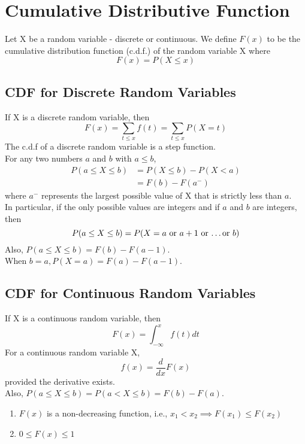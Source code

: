 \section{Cumulative Distributive Function}

\begin{definition}
Let X be a random variable - discrete or continuous. We define $F(x)$ to be the cumulative distribution function (c.d.f.) of the random variable X where
$$
F(x) = P(X \leq x)
$$
\end{definition}

\subsection{CDF for Discrete Random Variables}
If X is a discrete random variable, then
$$
F(x) = \sum_{t \leq x} f(t) = \sum_{t \leq x} P(X = t)
$$
The c.d.f of a discrete random variable is a step function. \\
For any two numbers $a$ and $b$ with $a \leq b$, 
\begin{equation*}
\begin{split}
    P(a \leq X \leq b) &= P(X \leq b) - P(X < a) \\
    &= F(b) - F(a^{-})
\end{split}
\end{equation*}
where $a^{-}$ represents the largest possible value of X that is strictly less than $a$. \\
In particular, if the only possible values are integers and if $a$ and $b$ are integers, then 
$$
P(a \leq X \leq b) = P(X = a \text{ or } a + 1 \text{ or \dots or } b)
$$
Also, $P(a \leq X \leq b) = F(b) - F(a - 1)$. \\
When $b = a, P(X = a) = F(a) - F(a - 1)$.

\subsection{CDF for Continuous Random Variables}
If X is a continuous random variable, then
$$
F(x) = \int_{-\infty}^x f(t) dt
$$
For a continuous random variable X, 
$$
f(x) = \dfrac{d}{dx}F(x)
$$ provided the derivative exists. \\
Also, $P(a \leq X \leq b) = P(a < X \leq b) = F(b) - F(a)$.

\begin{note}\end{note}
\hfill
\begin{enumerate}
    \item $F(x)$ is a non-decreasing function, i.e., $x_1 < x_2 \implies F(x_1) \leq F(x_2)$
    \item $0 \leq F(x) \leq 1$
\end{enumerate}


